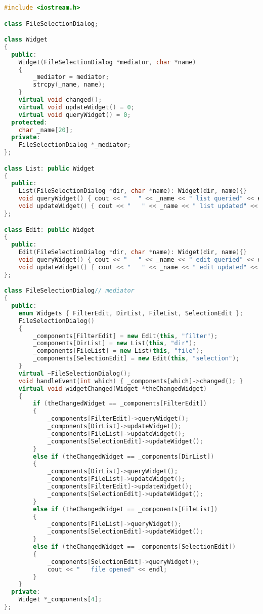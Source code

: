 \documentclass{book}
\begin{document}
\begin{lstlisting}[caption={Mediator Pattern Sample 3},language=C++]
#include <iostream.h>

class FileSelectionDialog;

class Widget
{
  public:
    Widget(FileSelectionDialog *mediator, char *name)
    {
        _mediator = mediator;
        strcpy(_name, name);
    }
    virtual void changed();
    virtual void updateWidget() = 0;
    virtual void queryWidget() = 0;
  protected:
    char _name[20];
  private:
    FileSelectionDialog *_mediator;
};

class List: public Widget
{
  public:
    List(FileSelectionDialog *dir, char *name): Widget(dir, name){}
    void queryWidget() { cout << "   " << _name << " list queried" << endl; }
    void updateWidget() { cout << "   " << _name << " list updated" << endl; }
};

class Edit: public Widget
{
  public:
    Edit(FileSelectionDialog *dir, char *name): Widget(dir, name){}
    void queryWidget() { cout << "   " << _name << " edit queried" << endl; }
    void updateWidget() { cout << "   " << _name << " edit updated" << endl; }
};

class FileSelectionDialog// mediator
{
  public:
    enum Widgets { FilterEdit, DirList, FileList, SelectionEdit };
    FileSelectionDialog()
    {
        _components[FilterEdit] = new Edit(this, "filter");
        _components[DirList] = new List(this, "dir");
        _components[FileList] = new List(this, "file");
        _components[SelectionEdit] = new Edit(this, "selection");
    }
    virtual ~FileSelectionDialog();
    void handleEvent(int which) { _components[which]->changed(); }
    virtual void widgetChanged(Widget *theChangedWidget)
    {
        if (theChangedWidget == _components[FilterEdit])
        {
            _components[FilterEdit]->queryWidget();
            _components[DirList]->updateWidget();
            _components[FileList]->updateWidget();
            _components[SelectionEdit]->updateWidget();
        }
        else if (theChangedWidget == _components[DirList])
        {
            _components[DirList]->queryWidget();
            _components[FileList]->updateWidget();
            _components[FilterEdit]->updateWidget();
            _components[SelectionEdit]->updateWidget();
        }
        else if (theChangedWidget == _components[FileList])
        {
            _components[FileList]->queryWidget();
            _components[SelectionEdit]->updateWidget();
        }
        else if (theChangedWidget == _components[SelectionEdit])
        {
            _components[SelectionEdit]->queryWidget();
            cout << "   file opened" << endl;
        }
    }
  private:
    Widget *_components[4];
};


\end{lstlisting}
\end{document}
